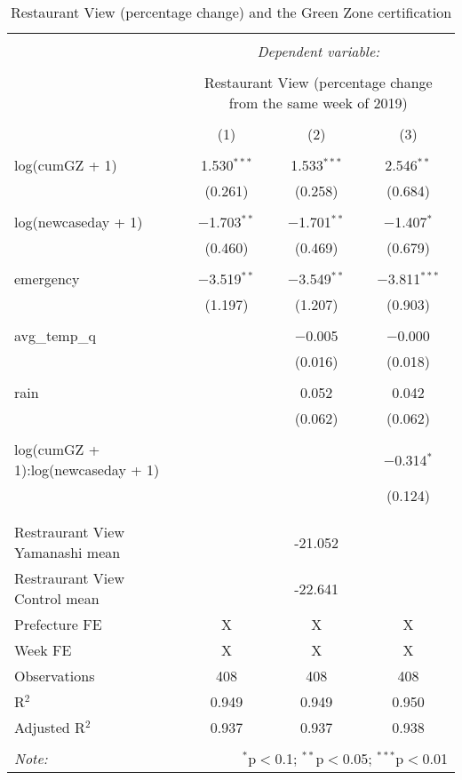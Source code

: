 
\begin{table}[!htbp] \centering 
  \caption{Restaurant View (percentage change) and the Green Zone certification} 
  \label{} 
\begin{tabular}{@{\extracolsep{5pt}}lccc} 
\\[-1.8ex]\hline 
\hline \\[-1.8ex] 
 & \multicolumn{3}{c}{\textit{Dependent variable:}} \\ 
\cline{2-4} 
\\[-1.8ex] & \multicolumn{3}{c}{Restaurant View (percentage change from the same week of 2019) } \\ 
\\[-1.8ex] & (1) & (2) & (3)\\ 
\hline \\[-1.8ex] 
 log(cumGZ + 1) & 1.530$^{***}$ & 1.533$^{***}$ & 2.546$^{**}$ \\ 
  & (0.261) & (0.258) & (0.684) \\ 
  & & & \\ 
 log(newcaseday + 1) & $-$1.703$^{**}$ & $-$1.701$^{**}$ & $-$1.407$^{*}$ \\ 
  & (0.460) & (0.469) & (0.679) \\ 
  & & & \\ 
 emergency & $-$3.519$^{**}$ & $-$3.549$^{**}$ & $-$3.811$^{***}$ \\ 
  & (1.197) & (1.207) & (0.903) \\ 
  & & & \\ 
 avg\_temp\_q &  & $-$0.005 & $-$0.000 \\ 
  &  & (0.016) & (0.018) \\ 
  & & & \\ 
 rain &  & 0.052 & 0.042 \\ 
  &  & (0.062) & (0.062) \\ 
  & & & \\ 
 log(cumGZ + 1):log(newcaseday + 1) &  &  & $-$0.314$^{*}$ \\ 
  &  &  & (0.124) \\ 
  & & & \\ 
\hline \\[-1.8ex] 
Restraurant View Yamanashi mean &  & -21.052 &  \\ 
Restraurant View Control mean &  & -22.641 &  \\ 
Prefecture FE & X & X & X \\ 
Week FE & X & X & X \\ 
Observations & 408 & 408 & 408 \\ 
R$^{2}$ & 0.949 & 0.949 & 0.950 \\ 
Adjusted R$^{2}$ & 0.937 & 0.937 & 0.938 \\ 
\hline 
\hline \\[-1.8ex] 
\textit{Note:}  & \multicolumn{3}{r}{$^{*}$p$<$0.1; $^{**}$p$<$0.05; $^{***}$p$<$0.01} \\ 
\end{tabular} 
\end{table} 
